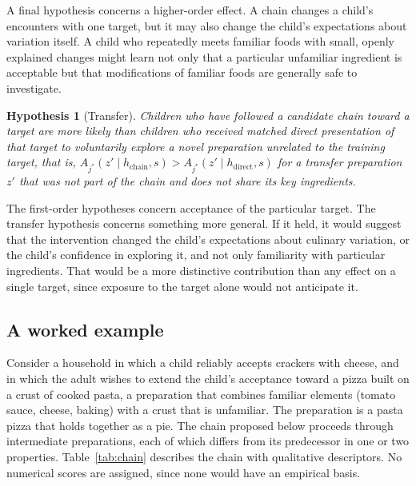 \documentclass[11pt]{article}
\newtheorem{hypothesis}{Hypothesis}
\theoremstyle{remark}
\begin{document}
A final hypothesis concerns a higher-order effect. A chain changes a child's encounters with one target, but it may also change the child's expectations about variation itself. A child who repeatedly meets familiar foods with small, openly explained changes might learn not only that a particular unfamiliar ingredient is acceptable but that modifications of familiar foods are generally safe to investigate.

\begin{hypothesis}[Transfer]\label{hyp:transfer}
Children who have followed a candidate chain toward a target are more likely than children who received matched direct presentation of that target to voluntarily explore a novel preparation unrelated to the training target, that is, $A_{j^*}(z' \mid h_{\text{chain}}, s) > A_{j^*}(z' \mid h_{\text{direct}}, s)$ for a transfer preparation $z'$ that was not part of the chain and does not share its key ingredients.
\end{hypothesis}

The first-order hypotheses concern acceptance of the particular target. The transfer hypothesis concerns something more general. If it held, it would suggest that the intervention changed the child's expectations about culinary variation, or the child's confidence in exploring it, and not only familiarity with particular ingredients. That would be a more distinctive contribution than any effect on a single target, since exposure to the target alone would not anticipate it.

\subsection{A worked example}

Consider a household in which a child reliably accepts crackers with cheese, and in which the adult wishes to extend the child's acceptance toward a pizza built on a crust of cooked pasta, a preparation that combines familiar elements (tomato sauce, cheese, baking) with a crust that is unfamiliar. The preparation is a pasta pizza that holds together as a pie. The chain proposed below proceeds through intermediate preparations, each of which differs from its predecessor in one or two properties. Table~\ref{tab:chain} describes the chain with qualitative descriptors. No numerical scores are assigned, since none would have an empirical basis.
\end{document}
